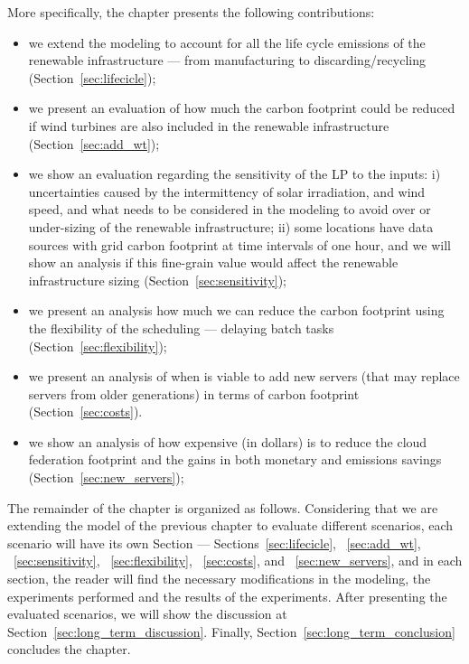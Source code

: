 More specifically, the chapter presents the following contributions:

\begin{itemize}
 
\item we extend the modeling to account for all the life cycle emissions of the renewable infrastructure --- from manufacturing to discarding/recycling (Section~\ref{sec:lifecicle});
\item we present an evaluation of how much the carbon footprint could be reduced if wind turbines are also included in the renewable infrastructure   (Section~\ref{sec:add_wt});
\item we show an evaluation regarding the sensitivity of the LP to the inputs: i) uncertainties caused by the intermittency of solar irradiation, and wind speed, and what needs to be considered in the modeling to avoid over or under-sizing of the renewable infrastructure; ii) some locations have data sources with grid carbon footprint at time intervals of one hour, and we will show an analysis if this fine-grain value would affect the renewable infrastructure sizing  (Section~\ref{sec:sensitivity});
\item we present an analysis how much we can reduce the carbon footprint using the flexibility of the scheduling --- delaying batch tasks (Section~\ref{sec:flexibility});
\item we present an analysis of when is viable to add new servers (that may replace servers from older generations) in terms of carbon footprint  (Section~\ref{sec:costs}).

\item we show an analysis of how expensive (in dollars) is to reduce the cloud federation footprint and the gains in both monetary and emissions savings (Section~\ref{sec:new_servers});
  
\end{itemize}


The remainder of the chapter is organized as follows. Considering that we are extending the model of the previous chapter to evaluate different scenarios, each scenario will have its own Section --- Sections~\ref{sec:lifecicle}, ~\ref{sec:add_wt}, ~\ref{sec:sensitivity}, ~\ref{sec:flexibility}, ~\ref{sec:costs}, and  ~\ref{sec:new_servers}, and in each section, the reader will find the necessary modifications in the modeling, the experiments performed and the results of the experiments. After presenting the evaluated scenarios, we will show the discussion at Section~\ref{sec:long_term_discussion}. Finally, Section~\ref{sec:long_term_conclusion} concludes the chapter.


